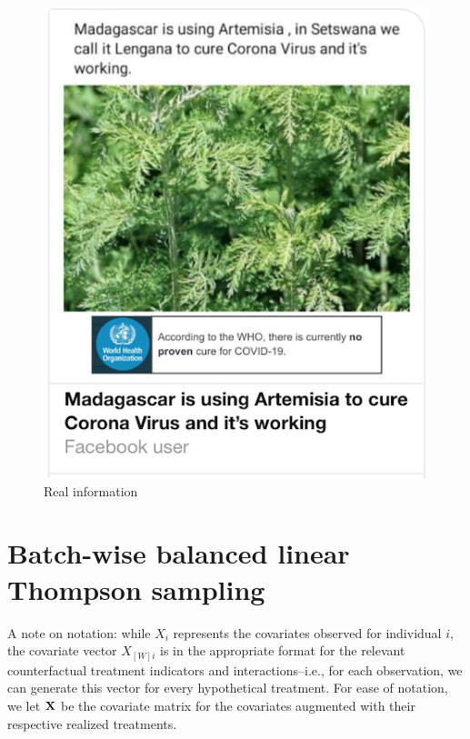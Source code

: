 \documentclass[letterpaper, 12pt, parskip=full,DIV=10]{scrartcl}
\begin{document}
\begin{figure}[htb]
\begin{minipage}{0.45\textwidth}
        \includegraphics[width=\textwidth]{figures/treat_realinfo.png} 
        \caption*{Real information}
    \end{minipage}
\end{figure}

\FloatBarrier
\section{Batch-wise balanced linear Thompson sampling}\label{appendix:agent}

A note on notation: while $X_i$ represents the covariates observed for individual $i$, the covariate vector $X_{[W]i}$ is in the appropriate format for the relevant counterfactual treatment indicators and interactions--i.e., for each observation, we can generate this vector for every hypothetical treatment. For ease of notation, we let $\mathbf{X}$ be the covariate matrix for the covariates augmented with their respective realized treatments. 
\end{document}

